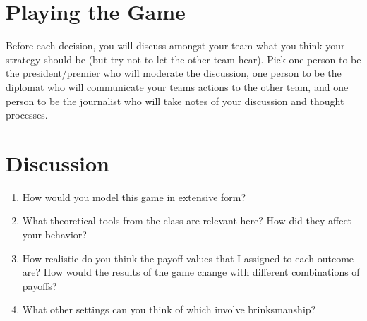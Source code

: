 \documentclass[12pt]{exam}
\begin{document}
\section*{Playing the Game}

Before each decision, you will discuss amongst your team what you think your strategy should be
(but try not to let the other team hear).
Pick one person to be the president/premier who will moderate the discussion, 
one person to be the diplomat who will communicate your teams actions to the other team,
and one person to be the journalist who will take notes of your discussion and thought processes.

\section*{Discussion}

\begin{enumerate}
  \item How would you model this game in extensive form? 
  \item What theoretical tools from the class are relevant here? How did they affect your behavior?
  \item How realistic do you think the payoff values that I assigned to each outcome are? How would the results of the game change with different combinations of payoffs?
  \item What other settings can you think of which involve brinksmanship? 
\end{enumerate}
\end{document}
